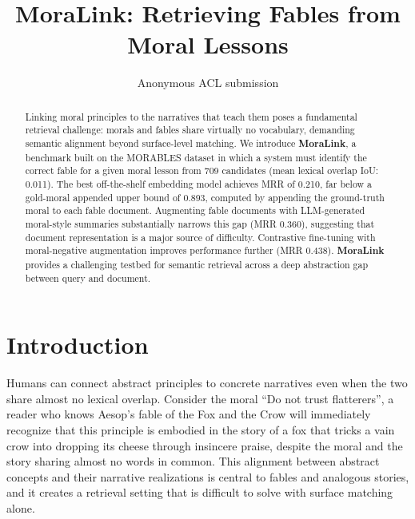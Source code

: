 \documentclass[11pt]{article}
\title{MoraLink: Retrieving Fables from Moral Lessons}
\author{Anonymous ACL submission}
\begin{document}
\maketitle

\begin{abstract}
Linking moral principles to the narratives that teach them poses a fundamental
retrieval challenge: morals and fables share virtually no vocabulary, demanding
semantic alignment beyond surface-level matching.
We introduce \textbf{MoraLink}, a benchmark built on the MORABLES dataset
\citep{marcuzzo-etal-2025-morables} in which a system must identify the correct
fable for a given moral lesson from 709 candidates (mean lexical overlap IoU:
0.011).
The best off-the-shelf embedding model achieves MRR of 0.210, far below a
gold-moral appended upper bound of 0.893, computed by appending the
ground-truth moral to each fable document.
Augmenting fable documents with LLM-generated moral-style summaries substantially
narrows this gap (MRR 0.360), suggesting that document representation is a major
source of difficulty.
Contrastive fine-tuning with moral-negative augmentation improves performance
further (MRR 0.438).
\textbf{MoraLink} provides a challenging testbed for semantic retrieval across a
deep abstraction gap between query and document.
\end{abstract}


\section{Introduction}

Humans can connect abstract principles to concrete narratives even when the two share almost no lexical overlap.
Consider the moral ``Do not trust flatterers'', a reader who knows Aesop's fable of the Fox and the Crow will immediately recognize that this principle is embodied in the story of a fox that tricks a vain crow into dropping its cheese through insincere praise, despite the moral and the story sharing almost no words in common. 
This alignment between abstract concepts and their narrative realizations is central to fables and analogous stories, and it creates a retrieval setting that is difficult to solve with surface matching alone.
\end{document}

